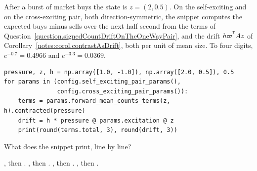 \begin{question}
\label{question.regimeSignAfterABurstOfBuys}
After a burst of market buys the state is $z = (2, 0.5)$.
On the self-exciting and on the cross-exciting pair,
both direction-symmetric,
the snippet computes the expected buys minus sells over the next half second
from the terms of Question~\ref{question.signedCountDriftOnTheOneWayPair},
and the drift $h\varpi^{^{\mathsf{T}}}A z$
of Corollary~\ref{notes:corol.contrastAsDrift},
both per unit of mean size.
To four digits, $e^{-0.7} = 0.4966$ and $e^{-3.3} = 0.0369$.
\begin{lstlisting}[caption={The forecast after a burst of buys}, label=listing.regimeSignAfterABurstOfBuys]
pressure, z, h = np.array([1.0, -1.0]), np.array([2.0, 0.5]), 0.5
for params in (config.self_exciting_pair_params(),
               config.cross_exciting_pair_params()):
    terms = params.forward_mean_counts_terms(z, h).contracted(pressure)
    drift = h * pressure @ params.excitation @ z
    print(round(terms.total, 3), round(drift, 3))
\end{lstlisting}
What does the snippet print, line by line?
\begin{choices}
 \choice {}, then .
 \choice {}, then .
 \choice {}, then .
 \correctchoice {}, then .
\end{choices}
\end{question}

